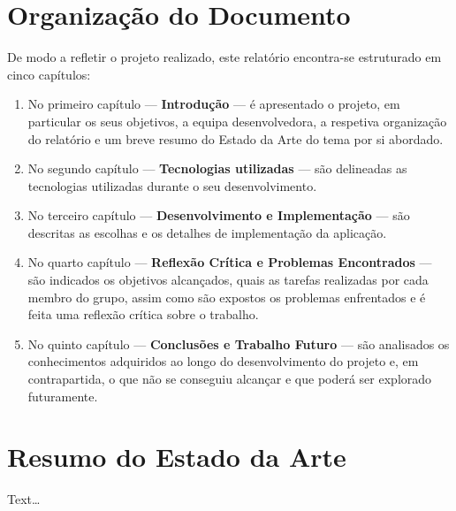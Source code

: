 \section{Organização do Documento}
\label{sec::intro:organizacao}
De modo a refletir o projeto realizado, este relatório encontra-se estruturado em cinco capítulos:

\begin{enumerate}
\item No primeiro capítulo --- \textbf{Introdução} --- é apresentado o projeto, em particular os seus objetivos, a equipa desenvolvedora, a respetiva organização do relatório e um breve resumo do Estado da Arte do tema por si abordado.

\item No segundo capítulo --- \textbf{Tecnologias utilizadas} --- são delineadas as tecnologias utilizadas durante o seu desenvolvimento.

\item No terceiro capítulo --- \textbf{Desenvolvimento e Implementação} --- são descritas as escolhas e os detalhes de implementação da aplicação.

\item No quarto capítulo --- \textbf{Reflexão Crítica e Problemas Encontrados} --- são indicados os objetivos alcançados, quais as tarefas realizadas por cada membro do grupo, assim como são expostos os problemas enfrentados e é feita uma reflexão crítica sobre o trabalho.

\item No quinto capítulo --- \textbf{Conclusões e Trabalho Futuro} --- são analisados os conhecimentos adquiridos ao longo do desenvolvimento do projeto e, em contrapartida, o que não se conseguiu alcançar e que poderá ser explorado futuramente.
\end{enumerate}


\section{Resumo do Estado da Arte}
\label{sec::intro:estado-arte}

Text\ldots